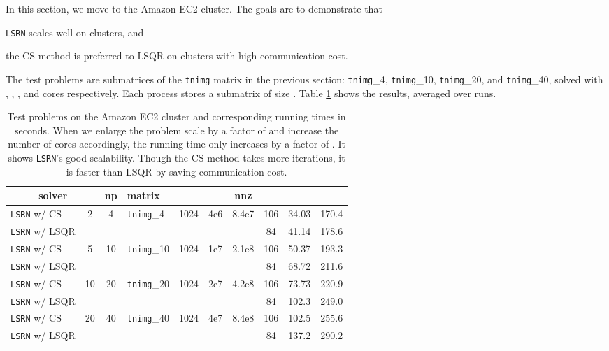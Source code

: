 \documentclass{siamltex}
\begin{document}
In this section, we move to the Amazon EC2 cluster. The goals are to
demonstrate that
\begin{inparaenum} 
\item[(1)] \texttt{LSRN} scales well on clusters, and
\item[(2)] the CS method is preferred to LSQR on clusters
  with high communication cost.
\end{inparaenum}
The test problems are submatrices of the \texttt{tnimg} matrix in the previous
section: \texttt{tnimg}\_4, \texttt{tnimg}\_10, \texttt{tnimg}\_20, and
\texttt{tnimg}\_40, solved with , , , and  cores
respectively. Each process stores a submatrix of size . Table \ref{tab:cluster} shows the results, averaged over 
runs.
\begin{table}
  \centering
  \caption{Test problems on the Amazon EC2 cluster and corresponding running
    times in seconds.  When we enlarge the problem scale by a factor of  and
    increase the number of cores accordingly, the running time only increases by a
    factor of . It shows \texttt{LSRN}'s good scalability.  Though the CS
    method takes more iterations, it is faster than LSQR by saving communication
    cost.}
\small
  \newcommand{\z}{\phantom0}
  \begin{tabular}{l|c|c|l|c|c|c|c|c|c}
    \ \ \ \ \ solver &  & np & matrix &  &  & nnz &   &  &  \\
    \hline
    \texttt{LSRN} w/ CS & \multirow{2}{*}{\z2} & \multirow{2}{*}{\z4} & \multirow{2}{*}{\texttt{tnimg}\_4} & \multirow{2}{*}{1024} & \multirow{2}{*}{4e6} & \multirow{2}{*}{8.4e7} & 106 & 34.03 & 170.4 \\
    \texttt{LSRN} w/ LSQR & & & & & & & \z84 & 41.14 & 178.6 \\
    \hline
    \texttt{LSRN} w/ CS & \multirow{2}{*}{\z5} & \multirow{2}{*}{10} &  \multirow{2}{*}{\texttt{tnimg}\_10} & \multirow{2}{*}{1024} & \multirow{2}{*}{1e7} & \multirow{2}{*}{2.1e8} & 106 & 50.37 & 193.3 \\
    \texttt{LSRN} w/ LSQR & & & & & & & \z84 & 68.72 & 211.6 \\
    \hline
    \texttt{LSRN} w/ CS & \multirow{2}{*}{10} & \multirow{2}{*}{20} &  \multirow{2}{*}{\texttt{tnimg}\_20} & \multirow{2}{*}{1024} & \multirow{2}{*}{2e7} & \multirow{2}{*}{4.2e8}   & 106 & 73.73 & 220.9 \\
    \texttt{LSRN} w/ LSQR & &  & &  & & & \z84 & 102.3 & 249.0 \\
    \hline
    \texttt{LSRN} w/ CS &  \multirow{2}{*}{20} & \multirow{2}{*}{40} &  \multirow{2}{*}{\texttt{tnimg}\_40} & \multirow{2}{*}{1024} & \multirow{2}{*}{4e7} & \multirow{2}{*}{8.4e8}  & 106 & 102.5 & 255.6 \\
    \texttt{LSRN} w/ LSQR & & & &  &  & & \z84 & 137.2 & 290.2 \\
  \end{tabular}
  \label{tab:cluster}
\end{table}
\end{document}
